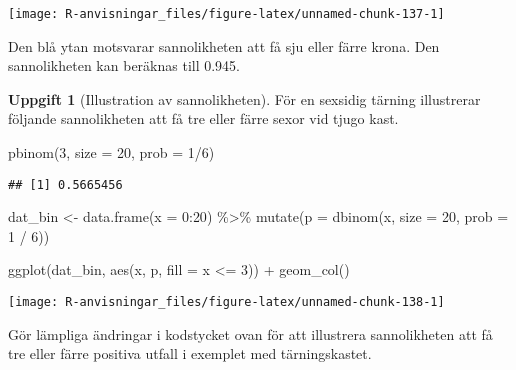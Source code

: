 \documentclass[
]{book}
\newenvironment{Shaded}{\begin{snugshade}}{\end{snugshade}}
\newcommand{\AttributeTok}[1]{\textcolor[rgb]{0.77,0.63,0.00}{#1}}
\newcommand{\DecValTok}[1]{\textcolor[rgb]{0.00,0.00,0.81}{#1}}
\newcommand{\FunctionTok}[1]{\textcolor[rgb]{0.00,0.00,0.00}{#1}}
\newcommand{\NormalTok}[1]{#1}
\newcommand{\OtherTok}[1]{\textcolor[rgb]{0.56,0.35,0.01}{#1}}
\newcommand{\SpecialCharTok}[1]{\textcolor[rgb]{0.00,0.00,0.00}{#1}}
\theoremstyle{definition}
\theoremstyle{definition}
\theoremstyle{definition}
\newtheorem{exercise}{Uppgift}[chapter]
\theoremstyle{definition}
\theoremstyle{remark}
\begin{document}
\begin{center}\texttt{[image: R-anvisningar\_files/figure-latex/unnamed-chunk-137-1]} \end{center}

Den blå ytan motsvarar sannolikheten att få sju eller färre krona. Den sannolikheten kan beräknas till 0.945.

\begin{exercise}[Illustration av sannolikheten]
För en sexsidig tärning illustrerar följande sannolikheten att få tre eller färre sexor vid tjugo kast.

\begin{Shaded}
\begin{Highlighting}[]
\FunctionTok{pbinom}\NormalTok{(}\DecValTok{3}\NormalTok{, }\AttributeTok{size =} \DecValTok{20}\NormalTok{, }\AttributeTok{prob =} \DecValTok{1}\SpecialCharTok{/}\DecValTok{6}\NormalTok{)}
\end{Highlighting}
\end{Shaded}

\begin{verbatim}
## [1] 0.5665456
\end{verbatim}

\begin{Shaded}
\begin{Highlighting}[]
\NormalTok{dat\_bin }\OtherTok{\textless{}{-}} \FunctionTok{data.frame}\NormalTok{(}\AttributeTok{x =} \DecValTok{0}\SpecialCharTok{:}\DecValTok{20}\NormalTok{) }\SpecialCharTok{\%\textgreater{}\%} 
  \FunctionTok{mutate}\NormalTok{(}\AttributeTok{p =} \FunctionTok{dbinom}\NormalTok{(x, }\AttributeTok{size =} \DecValTok{20}\NormalTok{, }\AttributeTok{prob =} \DecValTok{1} \SpecialCharTok{/} \DecValTok{6}\NormalTok{))}

\FunctionTok{ggplot}\NormalTok{(dat\_bin, }\FunctionTok{aes}\NormalTok{(x, p, }\AttributeTok{fill =}\NormalTok{ x }\SpecialCharTok{\textless{}=} \DecValTok{3}\NormalTok{)) }\SpecialCharTok{+}
  \FunctionTok{geom\_col}\NormalTok{()}
\end{Highlighting}
\end{Shaded}

\begin{center}\texttt{[image: R-anvisningar\_files/figure-latex/unnamed-chunk-138-1]} \end{center}

Gör lämpliga ändringar i kodstycket ovan för att illustrera sannolikheten att få tre eller färre positiva utfall i exemplet med tärningskastet.
\end{exercise}
\end{document}
